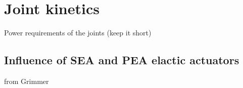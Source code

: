 \section{Joint kinetics} %
\label{sec:joint_kinetics}
Power requirements of the joints (keep it short)

\subsection{Influence of SEA and PEA elactic actuators} %
\label{sub:influence_of_sea_and_pea_elactic_actuators}
 from Grimmer



